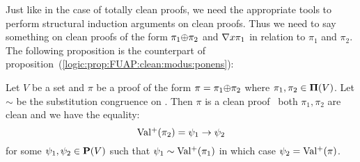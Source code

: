 Just like in the case of totally clean proofs, we need the
appropriate tools to perform structural induction arguments on clean
proofs. Thus we need to say something on clean proofs of the form
$\pi_{1}\mbox{$\oplus$}\pi_{2}$ and $\mbox{$\nabla$} x\pi_{1}$ in relation to $\pi_{1}$
and $\pi_{2}$. The following proposition is the counterpart of
proposition~(\ref{logic:prop:FUAP:clean:modus:ponens}):
\begin{prop}\label{logic:prop:FUAP:almostclean:modus:ponens}
Let $V$ be a set and $\pi$ be a proof of the form
$\pi=\pi_{1}\mbox{$\oplus$}\pi_{2}$ where $\pi_{1},\pi_{2}\in\mbox{${\bf\Pi}(V)$}$. Let $\sim$
be the substitution congruence on \pv. Then $\pi$ is a clean proof
\ifand\ both $\pi_{1},\pi_{2}$ are clean and we have the equality:
    \[
    \mbox{$\rm Val^{+}$}(\pi_{2})=\psi_{1}\to\psi_{2}
    \]
for some $\psi_{1},\psi_{2}\in\mbox{${\bf P}(V)$}$ such that
$\psi_{1}\sim\mbox{$\rm Val^{+}$}(\pi_{1})$ in which case $\psi_{2}=\mbox{$\rm Val^{+}$}(\pi)$.
\end{prop}
